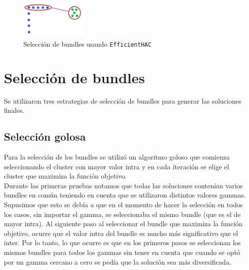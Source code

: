 \begin{figure}[H]
  \centering
    \includegraphics[width=0.3\textwidth]{img/cluster2.png}
  \caption{Selección de bundles usando \texttt{EfficientHAC}}
  \label{res:img-usingEfficientHAC}
\end{figure}

\section{Selección de bundles}
Se utilizaron tres estrategias de selección de bundles para generar las soluciones finales.
\subsection{Selección golosa}
Para la selección de los bundles se utilizó un algoritmo goloso que comienza seleccionando el 
cluster con mayor valor intra y en cada iteración se elige el cluster que maximiza la función 
objetivo.\\
Durante las primeras pruebas notamos que todas las soluciones contenían varios bundles en común 
teniendo en cuenta que se utilizaron distintos valores gammas. Supusimos que esto se debía a que en 
el momento de hacer la selección en todos los casos, sin importar el gamma, se seleccionaba el mismo 
bundle (que es el de mayor intra). Al siguiente paso al seleccionar el bundle que maximiza la 
función objetivo, ocurre que el valor intra del bundle es mucho más significativo que el inter. Por 
lo tanto, lo que ocurre es que en los primeros pasos se seleccionan los mismos bundles para todos 
los gammas sin tener en cuenta que cuando se optó por un gamma cercano a cero se pedía que la 
solución sea más diversificada.\\
